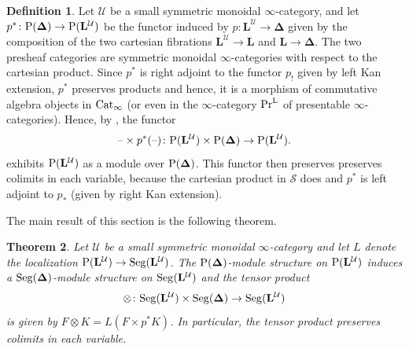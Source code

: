 \documentclass{amsart}
\newtheorem{theorem}{Theorem}
\numberwithin{theorem}{subsection}
\theoremstyle{definition}
\newtheorem{defn}[theorem]{Definition}
\newcommand{\xS}{\mathcal{S}}
\newcommand{\xU}{\mathcal{U}}
\newcommand{\Pre}{\name{P}}
\newcommand{\icat}{$\infty$-category}
\newcommand{\name}[1]{\ensuremath{\text{\textup{#1}}}}
\newcommand{\simp}{\mathbf{\Delta}}
\newcommand{\levelg}{\mathbf{L}}
\newcommand{\levelU}{\levelg^\xU}
\newcommand{\Seg}{\name{Seg}}
\newcommand{\blank}{\text{\textendash}}
\newcommand{\PrL}{\name{Pr}^{\mathrm{L}}}
\newcommand{\Cat}{\name{Cat}}
\newcommand{\CatI}{\Cat_{\infty}}
\begin{document}
\begin{defn}\label{def tensor}
	Let $\xU$ be a small symmetric monoidal \icat{}, and let $p^{*}\colon \Pre(\simp) \to \Pre(\levelU)$ be the functor induced by $p \colon \levelU \to \simp$ given by the composition of the two cartesian fibrations $\levelU \to \levelg$ and $\levelg \to
	\simp$.
	The two presheaf categories are symmetric monoidal $\infty$-categories with respect to the cartesian product. Since $p^*$ is right adjoint to the functor $p_!$ given by left Kan extension, $p^*$ preserves products and hence, it is a morphism of commutative algebra objects in $\CatI$ (or even in the $\infty$-category $\PrL$ of presentable $\infty$-categories).
	Hence, by \cite[Corollary 3.4.1.7]{ha}, the functor 
\[\blank \times p^{*}(\blank)\colon \Pre(\levelU) \times \Pre(\simp) \to \Pre(\levelU).\]
exhibits $\Pre(\levelU)$ as a module over $\Pre(\simp)$.
	This functor then preserves preserves colimits in each variable, because the cartesian product in $\xS$ does and $p^{*}$ is left adjoint to $p_*$ (given by right Kan extension).
\end{defn}

The main result of this section is the following theorem.
\begin{theorem}\label{theo tensor}
Let $\xU$ be a small symmetric monoidal \icat{} and let $L$ denote the localization $\Pre(\levelU) \to \Seg(\levelU)$.
The $\Pre(\simp)$-module structure on $\Pre(\levelU)$ induces a $\Seg(\simp)$-module structure on $\Seg(\levelU)$ and the tensor product
	\[\otimes \colon \Seg(\levelU) \times \Seg(\simp) \to \Seg(\levelU)\] 
	is given by $F \otimes K = L(F \times p^{*}K)$.
	In particular, the tensor product preserves colimits in each variable.
\end{theorem}
\end{document}
